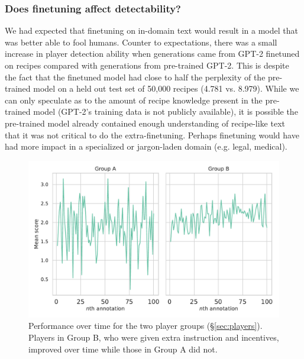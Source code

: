\subsubsection{Does finetuning affect detectability?}
We had expected that finetuning on in-domain text would result in a model that was better able to fool humans.
Counter to expectations, there was a small increase in player detection ability when generations came from GPT-2 finetuned on recipes compared with generations from pre-trained GPT-2. This is despite the fact that the finetuned model had close to half the perplexity of the pre-trained model on a held out test set of 50,000 recipes (4.781 vs. 8.979).
While we can only speculate as to the amount of recipe knowledge present in the pre-trained model (GPT-2's training data is not publicly available), it is possible the pre-trained model already contained enough understanding of recipe-like text that it was not critical to do the extra-finetuning.
Perhaps finetuning would have had more impact in a specialized or jargon-laden domain (e.g. legal, medical).



\begin{figure}[tb]
    \centering
    \includegraphics[scale=0.375]{figures/overtime.pdf}
    \caption{Performance over time for the two player groups (\S\ref{sec:players}). Players in Group B, who were given extra instruction and incentives, improved over time while those in Group A did not.}
    \label{fig:skill_over_time}
\end{figure}

